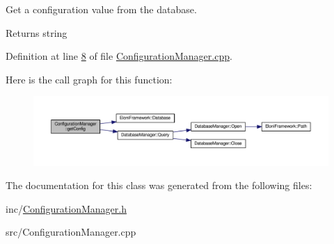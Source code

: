 Get a configuration value from the database. 

\begin{DoxyReturn}{Returns}
string 
\end{DoxyReturn}


Definition at line \hyperlink{ConfigurationManager_8cpp_source_l00008}{8} of file \hyperlink{ConfigurationManager_8cpp_source}{Configuration\-Manager.\-cpp}.



Here is the call graph for this function\-:
\nopagebreak
\begin{figure}[H]
\begin{center}
\leavevmode
\includegraphics[width=350pt]{classConfigurationManager_ad3e85ee715420c432cd7545c6aaf8314_cgraph}
\end{center}
\end{figure}




The documentation for this class was generated from the following files\-:\begin{DoxyCompactItemize}
\item 
inc/\hyperlink{ConfigurationManager_8h}{Configuration\-Manager.\-h}\item 
src/Configuration\-Manager.\-cpp\end{DoxyCompactItemize}
